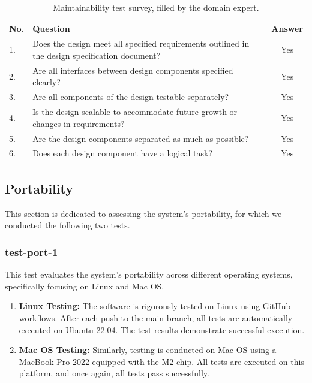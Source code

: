 \documentclass[12pt, titlepage]{article}
\begin{document}
\begin{table}[!h]
  \centering
  \caption{Maintainability test survey, filled by the domain expert.}
  \label{tab:maintain}
  \begin{tabular}{ p{0.5cm}|p{10cm}|c}
    \hline
    No. & Question                                                                                       & Answer \\
    \hline
    1.  & Does the design meet all specified requirements outlined in the design specification document? & Yes    \\
    2.  & Are all interfaces between design components specified clearly?                                & Yes    \\
    3.  & Are all components of the design testable separately?                                          & Yes    \\
    4.  & Is the design scalable to accommodate future growth or changes in requirements?                & Yes    \\
    5.  & Are the design components separated as much as possible?                                       & Yes    \\
    6.  & Does each design component have a logical task?                                                & Yes    \\
    \hline
  \end{tabular}
\end{table}

\subsection{Portability}
This section is dedicated to assessing the system's portability, 
for which we conducted the following two tests.

\subsubsection*{test-port-1}
This test evaluates the system's portability across different operating systems, 
specifically focusing on Linux and Mac OS.

\begin{enumerate}
    \item \textbf{Linux Testing:} 
    The software is rigorously tested on Linux using GitHub workflows. 
    After each push to the main branch, all tests are automatically 
    executed on Ubuntu 22.04. The test results demonstrate 
    successful execution.
    
    \item \textbf{Mac OS Testing:} 
    Similarly, testing is conducted on Mac OS using a MacBook Pro 2022 
    equipped with the M2 chip. All tests are executed on this platform, 
    and once again, all tests pass successfully.
\end{enumerate}
\end{document}

